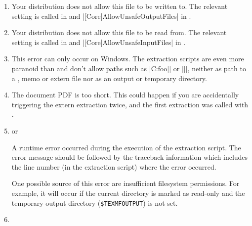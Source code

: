 \documentclass[a4paper,11pt]{article}
\begin{document}
\begin{enumerate}
\item\label{item:error:openin_any}

  Your  distribution does not allow this file to be written to.
  The relevant setting is called  in \TeXLive and
  |[Core]AllowUnsafeOutputFiles| in \MiKTeX.

\item {}

  Your  distribution does not allow this file to be read from. The
  relevant setting is called  in \TeXLive and
  |[Core]AllowUnsafeInputFiles| in \MiKTeX.
  
\item {}

  This error can only occur on Windows.  The extraction scripts are even more
  paranoid than  and don't allow paths such as |C:foo\bar| or
  |\foo\bar|, neither as path to a \dmmz, memo or extern file nor as an output
  or temporary directory.

\item {}

  The document PDF is too short. This could happen if you are accidentally
  triggering the extern extraction twice, and the first extraction was called
  with .

\item\label{item:error:runtime}  or 

  A runtime error occurred during the execution of the extraction script.  The
  error message should be followed by the traceback information which includes
  the line number (in the extraction script) where the error occurred.

  One possible source of this error are insufficient filesystem permissions.
  For example, it will occur if the current directory is marked as read-only
  and the temporary output directory (\texttt{\$TEXMFOUTPUT}) is not set.
  
\item {}


\end{enumerate}
\end{document}
